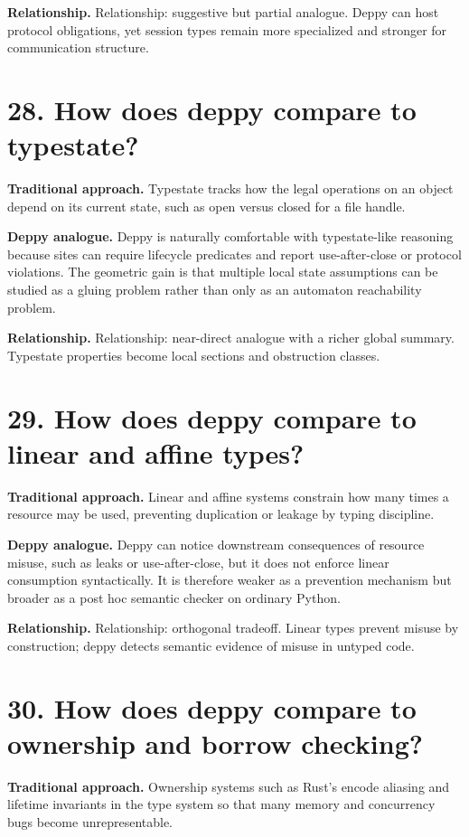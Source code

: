 \documentclass[11pt,openany]{book}
\begin{document}
\textbf{Relationship.} Relationship: suggestive but partial analogue. Deppy can host protocol obligations, yet session types remain more specialized and stronger for communication structure.

\section*{28. How does deppy compare to typestate?}
\textbf{Traditional approach.} Typestate tracks how the legal operations on an object depend on its current state, such as open versus closed for a file handle.

\textbf{Deppy analogue.} Deppy is naturally comfortable with typestate-like reasoning because sites can require lifecycle predicates and report use-after-close or protocol violations. The geometric gain is that multiple local state assumptions can be studied as a gluing problem rather than only as an automaton reachability problem.

\textbf{Relationship.} Relationship: near-direct analogue with a richer global summary. Typestate properties become local sections and obstruction classes.

\section*{29. How does deppy compare to linear and affine types?}
\textbf{Traditional approach.} Linear and affine systems constrain how many times a resource may be used, preventing duplication or leakage by typing discipline.

\textbf{Deppy analogue.} Deppy can notice downstream consequences of resource misuse, such as leaks or use-after-close, but it does not enforce linear consumption syntactically. It is therefore weaker as a prevention mechanism but broader as a post hoc semantic checker on ordinary Python.

\textbf{Relationship.} Relationship: orthogonal tradeoff. Linear types prevent misuse by construction; deppy detects semantic evidence of misuse in untyped code.

\section*{30. How does deppy compare to ownership and borrow checking?}
\textbf{Traditional approach.} Ownership systems such as Rust's encode aliasing and lifetime invariants in the type system so that many memory and concurrency bugs become unrepresentable.
\end{document}
